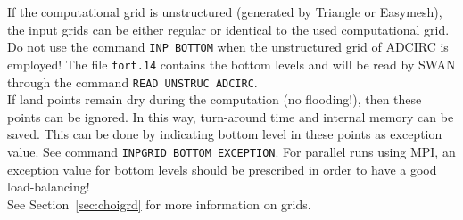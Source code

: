 \documentclass[12pt]{book}
\begin{document}
\noindent
If the computational grid is unstructured (generated by Triangle or Easymesh), the input grids can be either regular
or identical to the used computational grid.
\\[2ex]
\noindent
Do not use the command {\tt INP BOTTOM} when the unstructured grid of ADCIRC is employed!
The file {\tt fort.14} contains the bottom levels and will be read by SWAN through the command {\tt READ UNSTRUC ADCIRC}.
\\[2ex]
\noindent
If land points remain dry during the computation (no flooding!), then these points can be ignored.
In this way, turn-around time and internal memory can be saved. This can be done by indicating bottom level in these points as
exception value. See command {\tt INPGRID BOTTOM EXCEPTION}.
For parallel runs using MPI, an exception value for bottom levels should be prescribed in order
to have a good load-balancing!
\\[2ex]
\noindent
See Section~\ref{sec:choigrd} for more information on grids.
\end{document}
